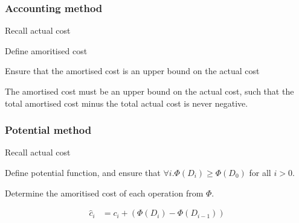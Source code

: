 \documentclass[10pt, a4paper,landscape]{article}
\begin{document}
\begin{multicols*}{4}
\subsubsection{Accounting method}
\begin{compactitem}
    \item Recall actual cost
    \item Define amoritised cost
    \item Ensure that the amortised cost is an upper bound on the actual cost
\end{compactitem}

The amortised cost must be an upper bound on the actual cost, such that the total amortised cost minus the total actual cost is never negative.

\subsubsection{Potential method}
\begin{compactitem}
    \item Recall actual cost
    \item Define potential function, and ensure that $\forall i. \Phi(D_i) \geq \Phi(D_0)$ for all $i > 0$.
    \item Determine the amoritised cost of each operation from $\Phi$.
\end{compactitem}

\begin{align*}
    \hat{c}_i &= c_i + (\Phi(D_i) - \Phi(D_{i - 1}))
\end{align*}


\end{multicols*}
\end{document}
